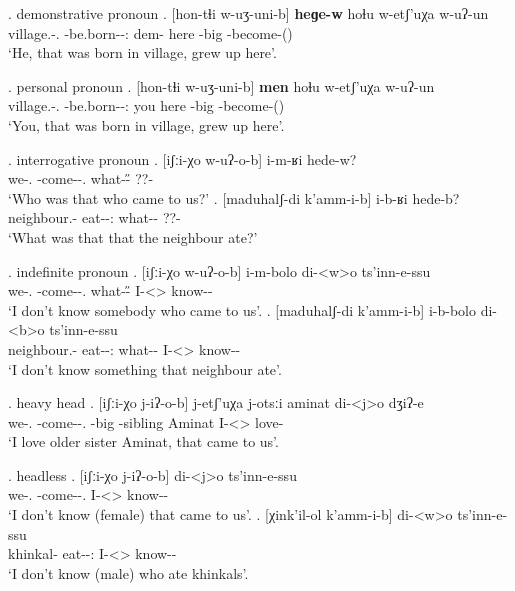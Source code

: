 \ex. demonstrative pronoun
	\ag. [hon-tɬi w-uʒ-uni-b] \textbf{heɡe-w} hoɬu w-etʃ'uχa w-uʔ-un\\
			{village.\Obl-\Inter.\Ess} {\M-be.born-\Pst-\Ptcp:\Pst} {dem-\M} here {\M-big} {\M-become-\Pst(\Aor)}\\
			\glt `He, that was born in village, grew up here'.

\ex. personal pronoun
	\ag. [hon-tɬi w-uʒ-uni-b] \textbf{men} hoɬu w-etʃ'uχa w-uʔ-un\\
			{village.\Obl-\Inter.\Ess} {\M-be.born-\Pst-\Ptcp:\Pst} you here {\M-big} {\M-become-\Pst(\Aor)}\\
			\glt `You, that was born in village, grew up here'.
			
\ex. interrogative pronoun
	\ag. [iʃːi-χo w-uʔ-o-b] i-m-ʁi hede-w?\\
			{we-\Add.\Lat} {\M-come-\Pst-\Ptcp.\Pst} {what-\H-\Wh} {??-\M}\\
			\glt `Who was that who came to us?'
	\bg. [maduhalʃ-di k'amm-i-b] i-b-ʁi hede-b?\\
			{neighbour.\Obl-\Erg} {eat-\Pst-\Ptcp:\Pst} {what-\Nh-\Wh} {??-\Nanf}\\
			\glt `What was that that the neighbour ate?'
		
\ex. indefinite pronoun
	\ag.  [iʃːi-χo w-uʔ-o-b] i-m-bolo di-<w>o  ts'inn-e-ssu\\
			{we-\Add.\Lat} {\M-come-\Pst-\Ptcp.\Pst} {what-\H-\Indef} {I-<\M>\Aff} {know-\Hab-\Neg}\\
			\glt `I don't know somebody who came to us'.
	\bg.  [maduhalʃ-di k'amm-i-b] i-b-bolo di-<b>o  ts'inn-e-ssu\\
			{neighbour.\Obl-\Erg} {eat-\Pst-\Ptcp:\Pst} {what-\Nh-\Indef} {I-<\Nanf>\Aff} {know-\Hab-\Neg}\\
			\glt `I don't know something that neighbour ate'.

\ex. heavy head
	\ag.  [iʃːi-χo j-iʔ-o-b] j-etʃ'uχa j-otsːi aminat di-<j>o dʒiʔ-e\\
			{we-\Add.\Lat} {\F-come-\Pst-\Ptcp.\Pst} {\F-big} {\F-sibling} Aminat {I-<\F>\Aff} {love-\Hab}\\
			\glt `I love older sister Aminat, that came to us'.

\ex. headless
	\ag.  [iʃːi-χo j-iʔ-o-b] di-<j>o ts'inn-e-ssu\\
			{we-\Add.\Lat} {\F-come-\Pst-\Ptcp.\Pst} {I-<\F>\Aff} {know-\Hab-\Neg}\\
			\glt `I don't know (female) that came to us'.
	\bg.  [χink'il-ol k'amm-i-b] di-<w>o ts'inn-e-ssu\\
			{khinkal-\Pl} {eat-\Pst-\Ptcp:\Pst} {I-<\M>\Aff} {know-\Hab-\Neg}\\
			\glt `I don't know (male) who ate khinkals'.

